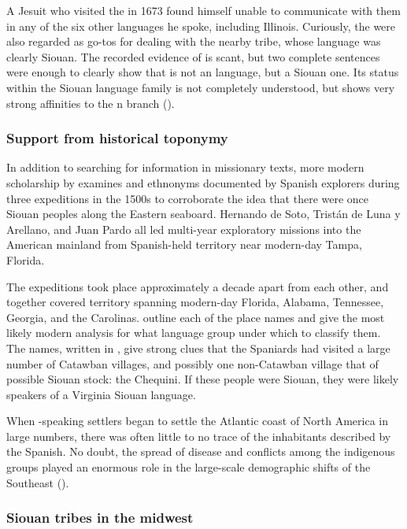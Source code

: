 \documentclass[output=paper]{LSP/langsci}
\begin{document}
A Jesuit who visited the  in 1673 found himself unable to communicate with them in any of the six other languages he spoke, including Illinois. Curiously, the  were also regarded as go-tos for dealing with the nearby  tribe, whose language was clearly Siouan. The recorded evidence of  is scant, but two complete sentences were enough to clearly show that  is not an  language, but a Siouan one. Its status within the Siouan language family is not completely understood, but  shows very strong affinities to the n branch (\citealt{Koontz1995a,Koontz1995b}).

\subsubsection{Support from historical toponymy} In addition to searching for information in missionary texts, more modern scholarship by \citet{BookerEtAl1992} examines  and ethnonyms documented by Spanish explorers during three expeditions in the 1500s to corroborate the idea that there were once Siouan peoples along the Eastern seaboard. Hernando de Soto, Trist\'an de Luna y Arellano, and Juan Pardo all led multi-year exploratory missions into the American mainland from Spanish-held territory near modern-day Tampa, Florida. 

The expeditions took place approximately a decade apart from each other, and together covered territory spanning modern-day Florida, Alabama, Tennessee, Georgia, and the Carolinas. \citet{BookerEtAl1992} outline each of the place names and give the most likely modern analysis for what language group under which to classify them. The names, written in  , give strong clues that the Spaniards had visited a large number of Catawban villages, and possibly one non-Catawban village that of possible Siouan stock: the Chequini. If these people were Siouan, they were likely speakers of a Virginia Siouan language.

When -speaking settlers began to settle the Atlantic coast of North America in large numbers, there was often little to no trace of the inhabitants described by the Spanish. No doubt, the spread of disease and conflicts among the indigenous groups played an enormous role in the large-scale demographic shifts of the Southeast (\citealt{Mann2006}). 

\subsubsection{Siouan tribes in the midwest}
\end{document}
